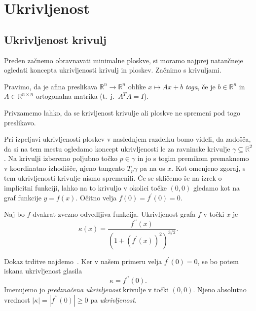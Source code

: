 \documentclass[fin1, tisk, bibtex]{fmfdelo}
\begin{document}
\newpage




\section{Ukrivljenost}

\subsection{Ukrivljenost krivulj}
Preden začnemo obravnavati minimalne ploskve, si moramo najprej natančneje ogledati koncepta ukrivljenosti krivulj in ploskev. Začnimo s krivuljami.

\begin{definicija}
    Pravimo, da je afina preslikava $\mathbb{R}^n \rightarrow \mathbb{R}^n$ oblike $x \mapsto A x+b$ \emph{toga}, če je $b \in \mathbb{R}^n$ in $A\in \mathbb{R}^{n\times n}$ ortogonalna matrika (t.~j.~$A^T A = I$).
\end{definicija}

Privzamemo lahko, da se krivljenost krivulje ali ploskve ne spremeni pod togo preslikavo.

Pri izpeljavi ukrivljenosti ploskev v naslednjem razdelku bomo videli, da zadošča, da si na tem mestu ogledamo koncept ukrivljenosti le za ravninske krivulje $\gamma \subseteq\mathbb{R}^2$. Na krivulji izberemo poljubno točko $p \in \gamma$ in jo s togim premikom premaknemo v koordinatno izhodišče, njeno tangento $T_p \gamma$ pa na os $x$. Kot omenjeno zgoraj, s tem ukrivljenosti krivulje nismo spremenili. Če se skličemo še na izrek o implicitni funkciji, lahko na to krivuljo v okolici točke $(0,0)$ gledamo kot na graf funkcije $y=f(x)$. Očitno velja $f(0)=f^{\prime}(0)=0$. 

\begin{trditev}
    Naj bo $f$ dvakrat zvezno odvedljiva funkcija. Ukrivljenost grafa $f$ v točki $x$ je
    \begin{equation*}
        \kappa(x)=\frac{f^{\prime \prime}(x)}{\left(1+\left(f^{\prime}(x)\right)^2\right)^{3/2}}.
    \end{equation*}
\end{trditev}

Dokaz trditve najdemo~\cite[str.~156]{ana2}. Ker v našem primeru velja $f^{\prime}(0)=0$, se bo potem iskana ukrivljenost glasila
\begin{equation}
    \kappa=f^{\prime \prime}(0). \label{eq:ukrivljenost}
\end{equation}
Imenujemo jo \emph{predznačena ukrivljenost} krivulje v točki $(0,0)$. Njeno absolutno vrednost $|\kappa|=\left|f^{\prime \prime}(0)\right| \geq 0$ pa \emph{ukrivljenost}.
\end{document}
